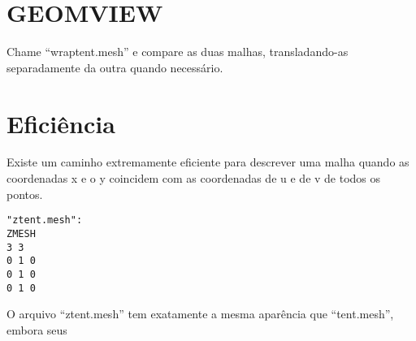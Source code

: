 \documentclass[12pt,a4paper]{book}
\begin{document}
\section{GEOMVIEW}

Chame ``wraptent.mesh'' e compare as duas malhas, transladando-as
separadamente da outra quando necessário.

\section{Eficiência}

Existe um caminho extremamente eficiente para descrever uma malha quando as coordenadas
x e o y coincidem com as coordenadas de u e de v de todos os pontos.

\begin{verbatim}
"ztent.mesh":
ZMESH
3 3
0 1 0
0 1 0
0 1 0
\end{verbatim}

O arquivo ``ztent.mesh'' tem exatamente a mesma aparência que ``tent.mesh'', embora seus
\end{document}
